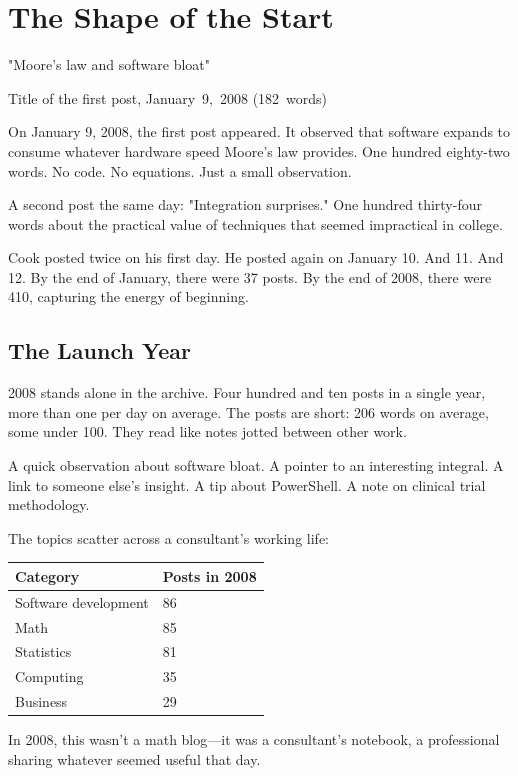\chapter{The Shape of the Start}

\nopagebreak
\epigraph{"Moore's law and software bloat"}{Title of the first post, January~9,~2008 (182~words)}
\nopagebreak

On January 9, 2008, the first post appeared. It observed that software expands to consume whatever hardware speed Moore's law provides. One hundred eighty-two words. No code. No equations. Just a small observation.

A second post the same day: "Integration surprises." One hundred thirty-four words about the practical value of techniques that seemed impractical in college.

Cook posted twice on his first day. He posted again on January 10. And 11. And 12. By the end of January, there were 37 posts. By the end of 2008, there were 410, capturing the energy of beginning.

\bigskip

\section*{The Launch Year}

2008 stands alone in the archive. Four hundred and ten posts in a single year, more than one per day on average. The posts are short: 206 words on average, some under 100. They read like notes jotted between other work.

A quick observation about software bloat. A pointer to an interesting integral. A link to someone else's insight. A tip about PowerShell. A note on clinical trial methodology.

The topics scatter across a consultant's working life:

\begin{longtable}{l p{6.5cm}}
\toprule
\textbf{Category} & \textbf{Posts in 2008} \tabularnewline
\midrule
Software development & 86 \tabularnewline
Math & 85 \tabularnewline
Statistics & 81 \tabularnewline
Computing & 35 \tabularnewline
Business & 29 \tabularnewline
\bottomrule
\end{longtable}

In 2008, this wasn't a math blog---it was a consultant's notebook, a professional sharing whatever seemed useful that day.


